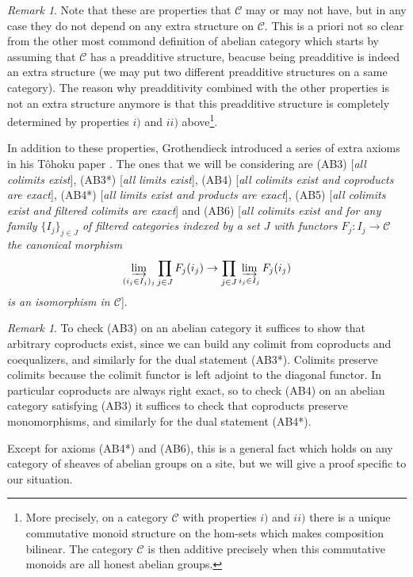 \documentclass[11pt,A4]{article}
\theoremstyle{plain}
\theoremstyle{definition}
\theoremstyle{remark}
\newtheorem{rem}[thm]{Remark}
\newcommand{\1}{\mathbbm{1}}
\newcommand{\scrC}{\mathscr{C}}
\begin{document}
\begin{rem}
    Note that these are properties that $\scrC$ may or may not have, but in any case they do not depend on any extra structure on $\scrC$.
    This is a priori not so clear from the other most commond definition of abelian category which starts by assuming that $\scrC$ has a preadditive structure, beacuse being preadditive is indeed an extra structure (we may put two different preadditive structures on a same category).
    The reason why preadditivity combined with the other properties is not an extra structure anymore is that this preadditive structure is completely determined by properties $i)$ and $ii)$ above\footnote{More precisely, on a category $\scrC$ with properties $i)$ and $ii)$ there is a unique commutative monoid structure on the hom-sets which makes composition bilinear.
    The category $\scrC$ is then additive precisely when this commutative monoids are all honest abelian groups.}.
\end{rem}

In addition to these properties, Grothendieck introduced a series of extra axioms in his T\^{o}hoku paper \cite{gro57}.
The ones that we will be considering are (AB3) [\textit{all colimits exist}], (AB3*) [\textit{all limits exist}], (AB4) [\textit{all colimits exist and coproducts are exact}], (AB4*) [\textit{all limits exist and products are exact}], (AB5) [\textit{all colimits exist and filtered colimits are exact}] and (AB6) [\textit{all colimits exist and for any family $\{ I_{j}\}_{j\in J}$ of filtered categories indexed by a set $J$ with functors $F_{j}\colon I_{j}\to \scrC$ the canonical morphism
	\[ \varinjlim_{(i_{j}\in I_{j})_{j}} \prod_{j\in J}F_{j}(i_{j})\to \prod_{j\in J}\varinjlim_{i_{j}\in I_{j}} F_{j}(i_{j}) \]
is an isomorphism in $\scrC$}].

\begin{rem}
    To check (AB3) on an abelian category it suffices to show that arbitrary coproducts exist, since we can build any colimit from coproducts and coequalizers, and similarly for the dual statement (AB3*).
    Colimits preserve colimits because the colimit functor is left adjoint to the diagonal functor.
    In particular coproducts are always right exact, so to check (AB4) on an abelian category satisfying (AB3) it suffices to check that coproducts preserve monomorphisms, and similarly for the dual statement (AB4*).
\end{rem}

Except for axioms (AB4*) and (AB6), this is a general fact which holds on any category of sheaves of abelian groups on a site, but we will give a proof specific to our situation.
\end{document}
